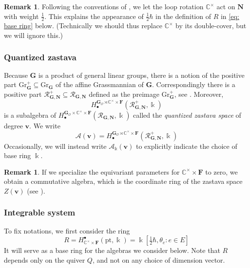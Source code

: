 \documentclass[11pt,reqno]{amsart}
\renewcommand{\mathbf}{\mathbold}
\numberwithin{equation}{section}
\theoremstyle{definition}
\newtheorem{Remark}[equation]{Remark}
\newcommand{\cA}{\mathcal{A}}
\newcommand{\bF}{\mathbf{F}}
\newcommand{\bG}{\mathbf{G}}
\newcommand{\bN}{\mathbf{N}}
\newcommand{\cO}{\mathcal{O}}
\newcommand{\cR}{\mathcal{R}}
\newcommand{\bv}{\mathbf{v}}
\newcommand{\CC}{\mathbb{C}}
\newcommand{\Gr}{\mathrm{Gr}}
\newcommand{\pt}{\mathrm{pt}}
\newcommand{\kk}{\Bbbk}
\renewcommand{\bv}{\mathbf{v}} %
\newcommand{\arrowset}{E}
\newcommand{\base}{R}
\newcommand{\qzast}{\cA}
\begin{document}
\begin{Remark}
    Following the conventions of \cite[\S 2(i)]{BFN1}, we let the loop rotation $\CC^\times$ act on $\bN$ with weight $\frac{1}{2}$. This explains the appearance of $\frac{1}{2}\hbar$ in the definition of $\base$ in \eqref{eq: base ring} below. (Technically we should thus replace $\CC^\times$ by its double-cover, but we will ignore this.) 
\end{Remark}


\subsubsection{Quantized zastava}

Because $\bG$ is a product of general linear groups, there is a notion of the positive part $\Gr^+_{\bG} \subseteq \Gr_{\bG}$ of the affine Grassmannian of $\bG$. Correspondingly there is a positive part $\cR^+_{\bG,\bN} \subseteq \cR_{\bG,\bN}$ defined as the preimage $\Gr_{\bG}^+$, see \cite[\S 3(ii)]{BFN2}. Moreover,
\begin{equation}
  \label{eq:51}
  H^{\bG_\cO \rtimes \CC^\times \times \bF}_{\bullet}(\cR^+_{\bG,\bN}, \kk)
\end{equation}
is a subalgebra of $H^{\bG_\cO \times \CC^\times \times \bF}_{\bullet}(\cR_{\bG,\bN},\kk)$ called the \emph{quantized zastava space} of degree $\bv$. We write
\begin{equation}
  \label{eq:52}
  \qzast(\bv) = H^{\bG_\cO \rtimes \CC^\times \times \bF}_{\bullet}(\cR^+_{\bG,\bN},\kk)
\end{equation}
Occasionally, we will instead write $\qzast_\kk(\bv)$ to explicitly indicate the choice of base ring $\kk$.



\begin{Remark}
If we specialize the equivariant parameters for $\CC^\times \times \bF$ to zero, we obtain a commutative algebra, which is the coordinate ring of the zastava space $Z(\bv)$ (see \cite[\S 3(ii)]{BFN2}).
\end{Remark}

\subsubsection{Integrable system}
\label{sec: integrable system}
To fix notations, we first consider the ring
\begin{equation}
\label{eq: base ring}
\base = H_{\CC^\times\times \bF}^\bullet(\pt, \kk)  = \kk[\tfrac{1}{2} \hbar, \theta_e : e \in \arrowset]
\end{equation}
It will serve as a base ring for the algebras we consider below. Note that $\base$ depends only on the quiver $Q$, and not on any choice of dimension vector.
\end{document}
